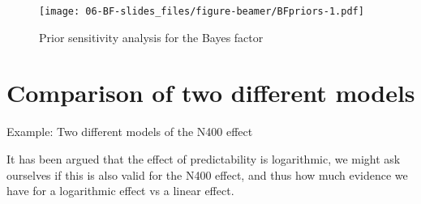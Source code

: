 \documentclass[12pt,ignorenonframetext,aspectratio=169]{beamer}
\newenvironment{Shaded}{\begin{snugshade}}{\end{snugshade}}
\newcommand{\DataTypeTok}[1]{\textcolor[rgb]{0.13,0.29,0.53}{#1}}
\newcommand{\KeywordTok}[1]{\textcolor[rgb]{0.13,0.29,0.53}{\textbf{#1}}}
\newcommand{\NormalTok}[1]{#1}
\newcommand{\OperatorTok}[1]{\textcolor[rgb]{0.81,0.36,0.00}{\textbf{#1}}}
\newcommand{\StringTok}[1]{\textcolor[rgb]{0.31,0.60,0.02}{#1}}
\begin{document}
\begin{frame}

\begin{figure}
\centering
\texttt{[image: 06-BF-slides\_files/figure-beamer/BFpriors-1.pdf]}
\caption{\label{fig:BFpriors}Prior sensitivity analysis for the Bayes factor}
\end{figure}

\end{frame}

\hypertarget{comparison-of-two-different-models}{%
\section{Comparison of two different models}\label{comparison-of-two-different-models}}

\begin{frame}[fragile]{Example: Two different models of the N400 effect}
\protect\hypertarget{example-two-different-models-of-the-n400-effect}{}

It has been argued that the effect of predictability is logarithmic, we might ask ourselves if this is also valid for the N400 effect, and thus how much evidence we have for a logarithmic effect vs a linear effect.

\footnotesize

\begin{Shaded}
\end{Shaded}

\end{frame}
\end{document}
